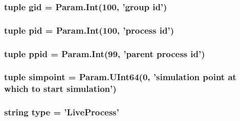 \label{classProcess_1_1LiveProcess_a1bc0ecd58c0cf2d4d931ef9b5028f86b}
\hypertarget{classProcess_1_1LiveProcess_afcfecdbbf80de1acde74dcf4a3693524}{
\subsubsection[{gid}]{\setlength{\rightskip}{0pt plus 5cm}tuple {\bf gid} = Param.Int(100, 'group id')}}
\label{classProcess_1_1LiveProcess_afcfecdbbf80de1acde74dcf4a3693524}
\hypertarget{classProcess_1_1LiveProcess_a78ed56667ab024ecb8e09b63a3ffab77}{
\subsubsection[{pid}]{\setlength{\rightskip}{0pt plus 5cm}tuple {\bf pid} = Param.Int(100, 'process id')}}
\label{classProcess_1_1LiveProcess_a78ed56667ab024ecb8e09b63a3ffab77}
\hypertarget{classProcess_1_1LiveProcess_a5f79b91788a6bbc4376a0ee7ee1a62c3}{
\subsubsection[{ppid}]{\setlength{\rightskip}{0pt plus 5cm}tuple {\bf ppid} = Param.Int(99, 'parent process id')}}
\label{classProcess_1_1LiveProcess_a5f79b91788a6bbc4376a0ee7ee1a62c3}
\hypertarget{classProcess_1_1LiveProcess_a388cf7cbe49669d2dd81edb0bc543b41}{
\subsubsection[{simpoint}]{\setlength{\rightskip}{0pt plus 5cm}tuple {\bf simpoint} = Param.UInt64(0, 'simulation point at which to start simulation')}}
\label{classProcess_1_1LiveProcess_a388cf7cbe49669d2dd81edb0bc543b41}
\hypertarget{classProcess_1_1LiveProcess_acce15679d830831b0bbe8ebc2a60b2ca}{
\subsubsection[{type}]{\setlength{\rightskip}{0pt plus 5cm}string {\bf type} = '{\bf LiveProcess}'}}
\label{classProcess_1_1LiveProcess_acce15679d830831b0bbe8ebc2a60b2ca}


